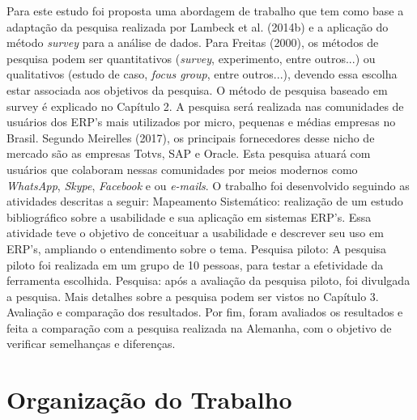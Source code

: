 Para este estudo foi proposta uma abordagem de trabalho que tem como base a adaptação da pesquisa realizada por Lambeck et al. (2014b) e a aplicação do método \textit{survey} para a análise de dados. Para Freitas (2000), os métodos de pesquisa podem ser quantitativos (\textit{survey}, experimento, entre outros...) ou qualitativos (estudo de caso, \textit{focus group}, entre outros...), devendo essa escolha estar associada aos objetivos da pesquisa. O método de pesquisa baseado em survey é explicado no Capítulo 2.\newline
\indent A pesquisa será realizada nas comunidades de usuários dos ERP’s mais utilizados por micro, pequenas e médias empresas no Brasil. Segundo Meirelles (2017), os principais fornecedores desse nicho de mercado são as empresas Totvs, SAP e Oracle. Esta pesquisa atuará com usuários que colaboram nessas comunidades por meios modernos como \textit{WhatsApp}, \textit{Skype}, \textit{Facebook} e ou \textit{e-mails}. O trabalho foi desenvolvido seguindo as atividades descritas a seguir:\newline
\indent Mapeamento Sistemático: realização de um estudo bibliográfico sobre a usabilidade e sua aplicação em sistemas ERP’s. Essa atividade teve o objetivo de conceituar a usabilidade e descrever seu uso em ERP’s, ampliando o entendimento sobre o tema.\newline
\indent Pesquisa piloto: A pesquisa piloto foi realizada em um grupo de 10 pessoas, para testar a efetividade da ferramenta escolhida.\newline
\indent Pesquisa: após a avaliação da pesquisa piloto, foi divulgada a pesquisa. Mais detalhes sobre a pesquisa podem ser vistos no Capítulo 3.\newline
\indent Avaliação e comparação dos resultados. Por fim, foram avaliados os resultados e feita a comparação com a pesquisa realizada na Alemanha, com o objetivo de verificar
semelhanças e diferenças.

\section{Organização do Trabalho} \label{Organização do Trabalho}

